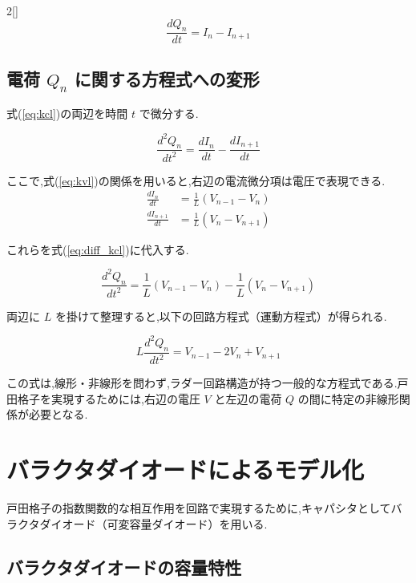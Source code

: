 \documentclass[a4paper,10pt]{article}
\begin{document}
\begin{multicols}{2}[\raggedcolumns]
\begin{equation}
    \frac{dQ_n}{dt} = I_n - I_{n+1} \label{eq:kcl}
\end{equation}

\subsection{電荷 $Q_n$ に関する方程式への変形}

式(\ref{eq:kcl})の両辺を時間 $t$ で微分する.

\begin{equation}
    \frac{d^2 Q_n}{dt^2} = \frac{dI_n}{dt} - \frac{dI_{n+1}}{dt} \label{eq:diff_kcl}
\end{equation}

ここで,式(\ref{eq:kvl})の関係を用いると,右辺の電流微分項は電圧で表現できる.
\begin{align}
    \frac{dI_n}{dt} &= \frac{1}{L}(V_{n-1} - V_n) \\
    \frac{dI_{n+1}}{dt} &= \frac{1}{L}(V_n - V_{n+1})
\end{align}

これらを式(\ref{eq:diff_kcl})に代入する.

\begin{equation}
    \frac{d^2 Q_n}{dt^2} = \frac{1}{L}(V_{n-1} - V_n) - \frac{1}{L}(V_n - V_{n+1})
\end{equation}

両辺に $L$ を掛けて整理すると,以下の回路方程式（運動方程式）が得られる.

\begin{equation}
    L \frac{d^2 Q_n}{dt^2} = V_{n-1} - 2V_n + V_{n+1} \label{eq:circuit_eom}
\end{equation}

この式は,線形・非線形を問わず,ラダー回路構造が持つ一般的な方程式である.戸田格子を実現するためには,右辺の電圧 $V$ と左辺の電荷 $Q$ の間に特定の非線形関係が必要となる.

\section{バラクタダイオードによるモデル化}

戸田格子の指数関数的な相互作用を回路で実現するために,キャパシタとしてバラクタダイオード（可変容量ダイオード）を用いる.

\subsection{バラクタダイオードの容量特性}


\end{multicols}
\end{document}
